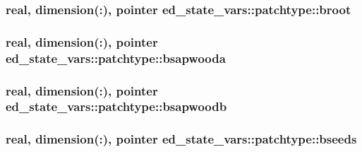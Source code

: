 \subsubsection[{\texorpdfstring{broot}{broot}}]{\setlength{\rightskip}{0pt plus 5cm}real, dimension(\+:), pointer ed\+\_\+state\+\_\+vars\+::patchtype\+::broot}\hypertarget{structed__state__vars_1_1patchtype_a04547c38d6d22055b32d113720bcf399}{}\label{structed__state__vars_1_1patchtype_a04547c38d6d22055b32d113720bcf399}
\subsubsection[{\texorpdfstring{bsapwooda}{bsapwooda}}]{\setlength{\rightskip}{0pt plus 5cm}real, dimension(\+:), pointer ed\+\_\+state\+\_\+vars\+::patchtype\+::bsapwooda}\hypertarget{structed__state__vars_1_1patchtype_a567ae7dda53aca5672d88d96102bcfbf}{}\label{structed__state__vars_1_1patchtype_a567ae7dda53aca5672d88d96102bcfbf}
\subsubsection[{\texorpdfstring{bsapwoodb}{bsapwoodb}}]{\setlength{\rightskip}{0pt plus 5cm}real, dimension(\+:), pointer ed\+\_\+state\+\_\+vars\+::patchtype\+::bsapwoodb}\hypertarget{structed__state__vars_1_1patchtype_a9f67ab50e89166cb6c62ce45733ed0ef}{}\label{structed__state__vars_1_1patchtype_a9f67ab50e89166cb6c62ce45733ed0ef}
\subsubsection[{\texorpdfstring{bseeds}{bseeds}}]{\setlength{\rightskip}{0pt plus 5cm}real, dimension(\+:), pointer ed\+\_\+state\+\_\+vars\+::patchtype\+::bseeds}\hypertarget{structed__state__vars_1_1patchtype_a8483608b6c8f85229b0b6ff1653b5a7f}{}\label{structed__state__vars_1_1patchtype_a8483608b6c8f85229b0b6ff1653b5a7f}

